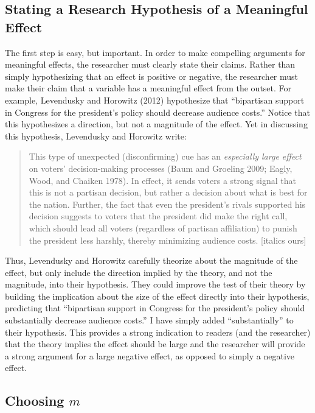 \documentclass[12pt]{article}
\begin{document}
\doublespace

\subsection*{Stating a Research Hypothesis of a Meaningful Effect}

The first step is easy, but important. In order to make compelling arguments for meaningful effects, the researcher must clearly state their claims. Rather than simply hypothesizing that an effect is positive or negative, the researcher must make their claim that a variable has a meaningful effect from the outset. For example, Levendusky and Horowitz (2012) hypothesize that ``bipartisan support in Congress for the president's policy should decrease audience costs.'' Notice that this hypothesizes a direction, but not a magnitude of the effect. Yet in discussing this hypothesis, Levendusky and Horowitz write: 

\begin{quote}
This type of unexpected (disconfirming) cue has an \emph{especially large effect} on voters' decision-making processes (Baum and Groeling 2009; Eagly, Wood, and Chaiken 1978). In effect, it sends voters a strong signal that this is not a partisan decision, but rather a decision about what is best for the nation. Further, the fact that even the president's rivals supported his decision suggests to voters that the president did make the right call, which should lead all voters (regardless of partisan affiliation) to punish the president less harshly, thereby minimizing audience costs. [italics ours]
\end{quote}

Thus, Levendusky and Horowitz carefully theorize about the magnitude of the effect, but only include the direction implied by the theory, and not the magnitude, into their hypothesis. They could improve the test of their theory by building the implication about the size of the effect directly into their hypothesis, predicting that ``bipartisan support in Congress for the president's policy should substantially decrease audience costs.'' I have simply added ``substantially'' to their hypothesis. This provides a strong indication to readers (and the researcher) that the theory implies the effect should be large and the researcher will provide a strong argument for a large negative effect, as opposed to simply a negative effect. 


\subsection*{Choosing $m$}
\end{document}

